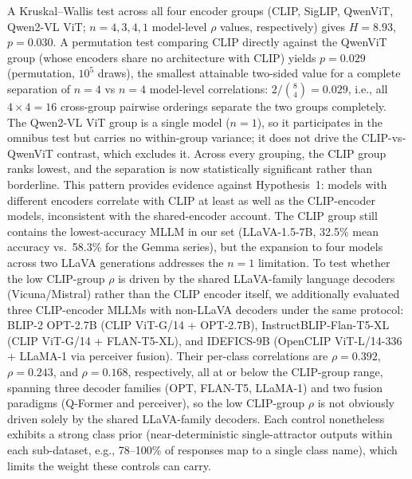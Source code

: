\documentclass[a4paper,fleqn]{cas-sc}
\begin{document}
 A Kruskal--Wallis test across all four encoder groups (CLIP, SigLIP, QwenViT, Qwen2-VL ViT; $n=4,3,4,1$ model-level $\rho$ values, respectively) gives $H=8.93$, $p=0.030$. A permutation test comparing CLIP directly against the QwenViT group (whose encoders share no architecture with CLIP) yields $p=0.029$ (permutation, $10^5$ draws), the smallest attainable two-sided value for a complete separation of $n=4$ vs $n=4$ model-level correlations: $2/\binom{8}{4}=0.029$, i.e., all $4\times 4=16$ cross-group pairwise orderings separate the two groups completely. The Qwen2-VL ViT group is a single model ($n=1$), so it participates in the omnibus test but carries no within-group variance; it does not drive the CLIP-vs-QwenViT contrast, which excludes it. Across every grouping, the CLIP group ranks lowest, and the separation is now statistically significant rather than borderline. This pattern provides evidence against Hypothesis~1: models with different encoders correlate with CLIP at least as well as the CLIP-encoder models, inconsistent with the shared-encoder account. The CLIP group still contains the lowest-accuracy MLLM in our set (LLaVA-1.5-7B, 32.5\% mean accuracy vs.\ 58.3\% for the Gemma series), but the expansion to four models across two LLaVA generations addresses the $n=1$ limitation. To test whether the low CLIP-group $\rho$ is driven by the shared LLaVA-family language decoders (Vicuna/Mistral) rather than the CLIP encoder itself, we additionally evaluated three CLIP-encoder MLLMs with non-LLaVA decoders under the same protocol: BLIP-2 OPT-2.7B (CLIP ViT-G/14 + OPT-2.7B), InstructBLIP-Flan-T5-XL (CLIP ViT-G/14 + FLAN-T5-XL), and IDEFICS-9B (OpenCLIP ViT-L/14-336 + LLaMA-1 via perceiver fusion). Their per-class correlations are $\rho=0.392$, $\rho=0.243$, and $\rho=0.168$, respectively, all at or below the CLIP-group range, spanning three decoder families (OPT, FLAN-T5, LLaMA-1) and two fusion paradigms (Q-Former and perceiver), so the low CLIP-group $\rho$ is not obviously driven solely by the shared LLaVA-family decoders. Each control nonetheless exhibits a strong class prior (near-deterministic single-attractor outputs within each sub-dataset, e.g., 78--100\% of responses map to a single class name), which limits the weight these controls can carry.
\end{document}
